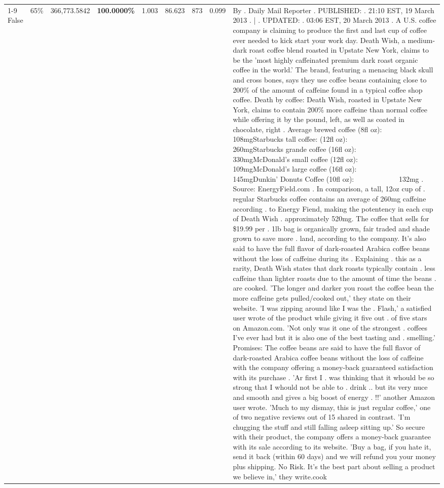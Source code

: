 \begin{table}[H]
{\begin{tabular}{lllrlllll}
\cline{1-9} \cline{2-9}
False & 65\% & 366,773.5842 & \bfseries \color{red} 100.0000\% & 1.003 & 86.623 & 873 & 0.099 & By . Daily Mail Reporter . PUBLISHED: . 21:10 EST, 19 March 2013 . | . UPDATED: . 03:06 EST, 20 March 2013 . A U.S. coffee company is claiming to produce the first and last cup of coffee ever needed to kick start your work day. Death Wish, a medium-dark roast coffee blend roasted in Upstate New York, claims to be the 'most highly caffeinated premium dark roast organic coffee in the world.' The brand, featuring a menacing black skull and cross bones, says they use coffee beans containing close to 200\% of the amount of caffeine found in a typical coffee shop coffee. Death by coffee: Death Wish, roasted in Upstate New York, claims to contain 200\% more caffeine than normal coffee while offering it by the pound, left, as well as coated in chocolate, right . Average brewed coffee (8fl oz):              108mgStarbucks tall coffee: (12fl oz):                260mgStarbucks grande coffee (16fl oz):         330mgMcDonald's small coffee (12fl oz):           109mgMcDonald's large coffee (16fl oz):           145mgDunkin' Donuts Coffee (10fl oz):             132mg . Source: EnergyField.com . In comparison, a tall, 12oz cup of . regular Starbucks coffee contains an average of 260mg caffeine according . to Energy Fiend, making the potentency in each cup of Death Wish . approximately 520mg. The coffee that sells for \$19.99 per . 1lb bag is organically grown, fair traded and shade grown to save more . land, according to the company. It's also said to have the full flavor of dark-roasted Arabica coffee beans without the loss of caffeine during its . Explaining . this as a rarity, Death Wish states that dark roasts typically contain . less caffeine than lighter roasts due to the amount of time the beans . are cooked. 'The longer and darker you roast the coffee bean the more caffeine gets pulled/cooked out,' they state on their website. 'I was zipping around like I was the . Flash,' a satisfied user wrote of the product while giving it five out . of five stars on Amazon.com. 'Not only was it one of the strongest . coffees I've ever had but it is also one of the best tasting and . smelling.’ Promises: The coffee beans are said to have the full flavor of dark-roasted Arabica coffee beans without the loss of caffeine with the company offering a money-back guaranteed satisfaction with its purchase . 'Ar first I . was thinking that it whould be so strong that I whould not be able to . drink .. but its very nuce and smooth and gives a big boost of energy . !!' another Amazon user wrote. 'Much to my dismay, this is just regular coffee,' one of two negative reviews out of 15 shared in contrast. 'I'm chugging the stuff and still falling asleep sitting up.' So secure with their product, the company offers a money-back guarantee with its sale according to its website. 'Buy a bag, if you hate it, send it back (within 60 days) and we will refund you your money plus shipping. No Risk. It’s the best part about selling a product we believe in,' they write.cook \\

\end{tabular}}
\end{table}
